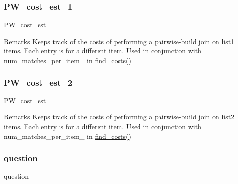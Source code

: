 \subsubsection{\texorpdfstring{PW\_cost\_est\_1}{PW\_cost\_est\_1}}
{\footnotesize\ttfamily P\+W\+\_\+cost\+\_\+est\+\_}

\begin{DoxyRemark}{Remarks}
Keeps track of the costs of performing a pairwise-\/build join on list1 items. Each entry is for a different item. Used in conjunction with num\+\_\+matches\+\_\+per\+\_\+item\+\_ in \mbox{\hyperlink{classdynamicfilterapp_1_1models_1_1_join_ac9cef0d40608117205ed9d5118f5f87c}{find\+\_\+costs()}} 
\end{DoxyRemark}
\mbox{\label{classdynamicfilterapp_1_1models_1_1_join_a813429f929973d3f9b0d2f8e7f6b7c23}} 
\subsubsection{\texorpdfstring{PW\_cost\_est\_2}{PW\_cost\_est\_2}}
{\footnotesize\ttfamily P\+W\+\_\+cost\+\_\+est\+\_}

\begin{DoxyRemark}{Remarks}
Keeps track of the costs of performing a pairwise-\/build join on list2 items. Each entry is for a different item. Used in conjunction with num\+\_\+matches\+\_\+per\+\_\+item\+\_ in \mbox{\hyperlink{classdynamicfilterapp_1_1models_1_1_join_ac9cef0d40608117205ed9d5118f5f87c}{find\+\_\+costs()}} 
\end{DoxyRemark}
\mbox{\label{classdynamicfilterapp_1_1models_1_1_join_a1a1b6bd27a93f9139a2f44d01f7b3ad1}} 
\subsubsection{\texorpdfstring{question}{question}}
{\footnotesize\ttfamily question}

\mbox{\label{classdynamicfilterapp_1_1models_1_1_join_ab02c604e800be098cbf308833b3442c0}} 
